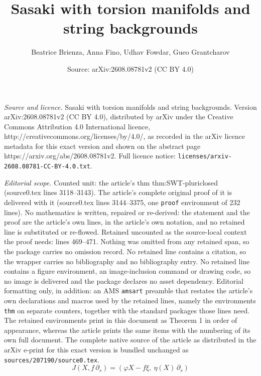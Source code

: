 \documentclass[10pt,a4paper]{amsart}
\title{Sasaki with torsion manifolds and string backgrounds}
\author{Beatrice Brienza, Anna Fino, Udhav Fowdar, Gueo Grantcharov}
\date{Source: arXiv:2608.08781v2 (CC BY 4.0)}
\renewcommand{\phi}{\varphi}
\begin{document}
\maketitle

\noindent\emph{Source and licence.} Sasaki with torsion manifolds and string backgrounds. Version arXiv:2608.08781v2 (CC BY 4.0), distributed by arXiv under the Creative Commons Attribution 4.0 International licence, http://creativecommons.org/licenses/by/4.0/, as recorded in the arXiv licence metadata for this exact version and shown on the abstract page https://arxiv.org/abs/2608.08781v2. Full licence notice: \texttt{licenses/arxiv-2608.08781-CC-BY-4.0.txt}.\par\smallskip

\noindent\textit{Editorial scope.} Counted unit: the article's thm thm:SWT-pluriclosed (source0.tex lines 3118--3143). The article's complete original proof of it is delivered with it (source0.tex lines 3144--3375, one \texttt{proof} environment of 232 lines). No mathematics is written, repaired or re-derived: the statement and the proof are the article's own lines, in the article's own notation, and no retained line is substituted or re-flowed.  Retained uncounted as the source-local context the proof needs: lines 469--471.  Nothing was omitted from any retained span, so the package carries no omission record.  No retained line contains a citation, so the wrapper carries no bibliography and no bibliography entry.  No retained line contains a figure environment, an image-inclusion command or drawing code, so no image is delivered and the package declares no asset dependency.  Editorial formatting only, in addition: an AMS \texttt{amsart} preamble that restates the article's own declarations and macros used by the retained lines, namely the environments \texttt{thm} on separate counters, together with the standard packages those lines need.  The retained environments print in this document as Theorem 1 in order of appearance, whereas the article prints the same items with the numbering of its own full document.  The complete native source of the article as distributed in the arXiv e-print for this exact version is bundled unchanged as \texttt{sources/207190/source0.tex}.
\begin{equation} \label{eqn:cpxstructure}
    J(X, f\,\partial_s) = (\phi X - f \xi,\ \eta(X)\,\partial_s)
\end{equation}
\end{document}
